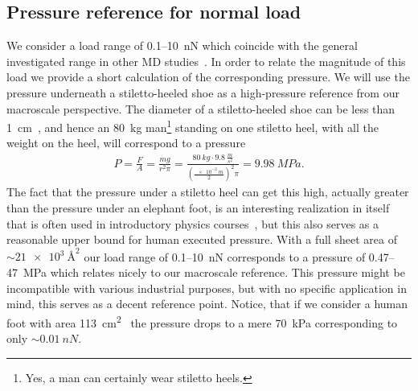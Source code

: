 \subsection{Pressure reference for normal load}
We consider a load range of 0.1--\SI{10}{nN} which coincide with the general investigated range in other \acrshort{MD} studies~\cite{li_evolving_2016, zhu_study_2018, zhu_study_2018}. In order to relate the magnitude of this load we provide a short calculation of the corresponding pressure. We will use the pressure underneath a stiletto-heeled shoe as a high-pressure reference from our macroscale perspective. The diameter of a stiletto-heeled
shoe can be less than \SI{1}{cm}~\cite{stiletto_1}, and hence an \SI{80}{kg} man\footnote{Yes, a man can certainly
wear stiletto heels.} standing on one stiletto heel, with all the weight on the heel, will correspond to a pressure
\begin{align*}
  P = \frac{F}{A} = \frac{mg}{r^2\pi} = \frac{\SI{80}{kg} \cdot \SI{9.8}{\frac{m}{s^2}}}{(\frac{\SI{e-2}{m}}{2})^2 \pi} = \SI{9.98}{MPa}.
\end{align*} 
The fact that the pressure under a stiletto heel can get this high, actually greater than the pressure under an elephant foot, is an interesting realization in itself that is often used in
introductory physics courses~\cite{stiletto_2}, but this also serves as a reasonable upper bound for human executed pressure. With
a full sheet area of $\sim\SI{21e3}{{\text{Å}}^2}$ our load range of 0.1--\SI{10}{nN} corresponds to a pressure of 0.47--\SI{47}{MPa} which relates nicely to our macroscale reference. This pressure might be incompatible with various industrial purposes, but with no specific application in mind, this serves as a decent reference point. Notice, that if we consider a human foot with area \SI{113}{cm^2}~\cite{stiletto_3} the pressure drops to a mere \SI{70}{kPa} corresponding to only $\sim \SI{0.01}{nN}$.



